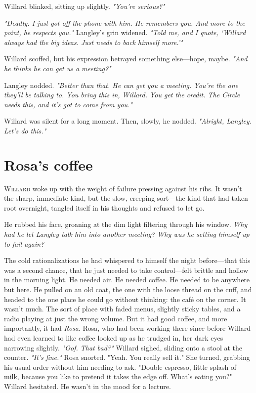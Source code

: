 Willard blinked, sitting up slightly. \textit{"You’re serious?"}

\textit{"Deadly. I just got off the phone with him. He remembers you. And more to the point, he respects you."} Langley’s grin widened. \textit{"Told me, and I quote, ‘Willard always had the big ideas. Just needs to back himself more.’"} 

Willard scoffed, but his expression betrayed something else—hope, maybe. \textit{"And he thinks he can get us a meeting?"}

Langley nodded. \textit{"Better than that. He can get you a meeting. You’re the one they’ll be talking to. You bring this in, Willard. You get the credit. The Circle needs this, and it’s got to come from you."}

Willard was silent for a long moment. Then, slowly, he nodded. \textit{"Alright, Langley. Let’s do this."}




\newpage
\section*{Rosa's coffee}

\lettrine{W}{illard} woke up with the weight of failure pressing against his ribs. It wasn’t the sharp, immediate kind, but the slow, creeping sort—the kind that had taken root overnight, tangled itself in his thoughts and refused to let go. 

He rubbed his face, groaning at the dim light filtering through his window. \textit{Why had he let Langley talk him into another meeting? Why was he setting himself up to fail again?}

The cold rationalizations he had whispered to himself the night before—that this was a second chance, that he just needed to take control—felt brittle and hollow in the morning light. He needed air. He needed coffee. He needed to be anywhere but here. He pulled on an old coat, the one with the loose thread on the cuff, and headed to the one place he could go without thinking: the café on the corner. 
\smallskip
It wasn’t much. The sort of place with faded menus, slightly sticky tables, and a radio playing at just the wrong volume. But it had good coffee, and more importantly, it had \textit{Rosa}.
\smallskip
Rosa, who had been working there since before Willard had even learned to like coffee looked up as he trudged in, her dark eyes narrowing slightly. \textit{"Oof. That bad?"}
\smallskip
Willard sighed, sliding onto a stool at the counter. \textit{"It’s fine."}
\smallskip
Rosa snorted. "Yeah. You really sell it." She turned, grabbing his usual order without him needing to ask. "Double espresso, little splash of milk, because you like to pretend it takes the edge off. What’s eating you?"
\smallskip
Willard hesitated. He wasn’t in the mood for a lecture. 

